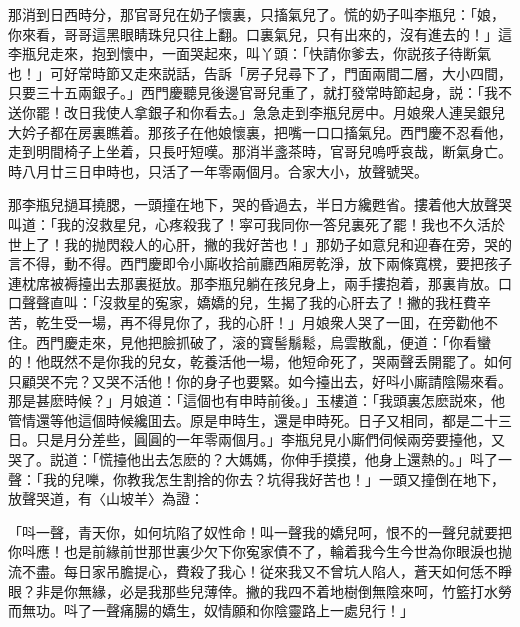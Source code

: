 那消到日西時分，那官哥兒在奶子懷裏，只搐氣兒了。慌的奶子叫李瓶兒：「娘，你來看，哥哥這黑眼睛珠兒只往上翻。口裏氣兒，只有出來的，沒有進去的！」這李瓶兒走來，抱到懷中，一面哭起來，叫丫頭：「快請你爹去，你説孩子待断氣也！」可好常時節又走來説話，告訴「房子兒尋下了，門面兩間二層，大小四間，只要三十五兩銀子。」西門慶聽見後邊官哥兒重了，就打發常時節起身，説：「我不送你罷！改日我使人拿銀子和你看去。」急急走到李瓶兒房中。月娘衆人連吴銀兒大妗子都在房裏瞧着。那孩子在他娘懷裏，把嘴一口口搐氣兒。西門慶不忍看他，走到明間椅子上坐着，只長吁短嘆。那消半盞茶時，官哥兒嗚呼哀哉，断氣身亡。時八月廿三日申時也，只活了一年零兩個月。合家大小，放聲號哭。

那李瓶兒撾耳撓腮，一頭撞在地下，哭的昏過去，半日方纔甦省。摟着他大放聲哭叫道：「我的沒救星兒，心疼殺我了！寜可我同你一答兒裏死了罷！我也不久活於世上了！我的抛閃殺人的心肝，撇的我好苦也！」那奶子如意兒和迎春在旁，哭的言不得，動不得。西門慶即令小廝收拾前廳西廂房乾淨，放下兩條寬櫈，要把孩子連枕席被褥擡出去那裏挺放。那李瓶兒躺在孩兒身上，兩手摟抱着，那裏肯放。口口聲聲直叫：「沒救星的寃家，嬌嬌的兒，生揭了我的心肝去了！撇的我枉費辛苦，乾生受一場，再不得見你了，我的心肝！」月娘衆人哭了一囬，在旁勸他不住。西門慶走來，見他把臉抓破了，滚的寳髻鬅鬆，烏雲散亂，便道：「你看蠻的！他既然不是你我的兒女，乾養活他一場，他短命死了，哭兩聲丢開罷了。如何只顧哭不完？又哭不活他！你的身子也要緊。如今擡出去，好呌小廝請陰陽來看。那是甚麽時候？」月娘道：「這個也有申時前後。」玉樓道：「我頭裏怎麽説來，他管情還等他這個時候纔囬去。原是申時生，還是申時死。日子又相同，都是二十三日。只是月分差些，圓圓的一年零兩個月。」李瓶兒見小廝們伺候兩旁要擡他，又哭了。説道：「慌擡他出去怎麽的？大媽媽，你伸手摸摸，他身上還熱的。」呌了一聲：「我的兒嚛，你教我怎生割捨的你去？坑得我好苦也！」一頭又撞倒在地下，放聲哭道，有〈山坡羊〉為證：

\begin{myquote}
「呌一聲，青天你，如何坑陷了奴性命！叫一聲我的嬌兒呵，恨不的一聲兒就要把你呌應！也是前緣前世那世裏少欠下你寃家債不了，輪着我今生今世為你眼淚也抛流不盡。每日家吊膽提心，費殺了我心！従來我又不曾坑人陷人，蒼天如何恁不睜眼？非是你無緣，必是我那些兒薄倖。撇的我四不着地樹倒無陰來呵，竹籃打水勞而無功。呌了一聲痛腸的嬌生，奴情願和你陰靈路上一處兒行！」
\end{myquote}


